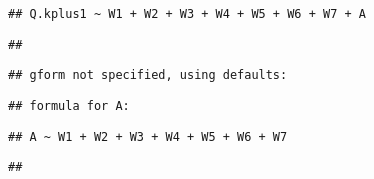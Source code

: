 \documentclass[
]{article}
\begin{document}
\begin{verbatim}
## Q.kplus1 ~ W1 + W2 + W3 + W4 + W5 + W6 + W7 + A
\end{verbatim}

\begin{verbatim}
## 
\end{verbatim}

\begin{verbatim}
## gform not specified, using defaults:
\end{verbatim}

\begin{verbatim}
## formula for A:
\end{verbatim}

\begin{verbatim}
## A ~ W1 + W2 + W3 + W4 + W5 + W6 + W7
\end{verbatim}

\begin{verbatim}
## 
\end{verbatim}
\end{document}
